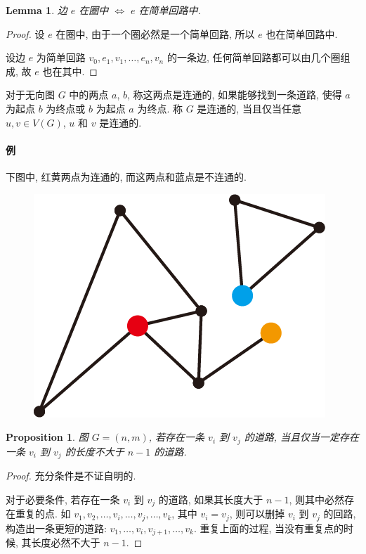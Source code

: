 \documentclass[UTF8]{ctexart}
\theoremstyle{mystyle}
\newtheorem{lemma}{Lemma}[section]
\newtheorem{proposition}{Proposition}[section]
\theoremstyle{myremark}
\theoremstyle{plain}
\begin{document}
\begin{lemma}
    边 $ e $ 在圈中 $ \iff $ $ e $ 在简单回路中.
\end{lemma}

\begin{proof}
    设 $ e $ 在圈中, 由于一个圈必然是一个简单回路, 所以 $ e $ 也在简单回路中.

    设边 $ e $ 为简单回路 $ v_0, e_1, v_1, \dots, e_n, v_n $ 的一条边, 任何简单回路都可以由几个圈组成, 故 $ e $ 也在其中.
\end{proof}



\begin{definition}[\text{连通}]
    对于无向图 $ G $ 中的两点 $ a $, $ b $, 称这两点是连通的, 如果能够找到一条道路, 使得 $ a $ 为起点 $ b $ 为终点或 $ b $ 为起点 $ a $ 为终点. 称 $ G $ 是连通的, 当且仅当任意 $ u, v \in V(G) $, $ u $ 和 $ v $ 是连通的.
\end{definition}

\paragraph{例}
下图中, 红黄两点为连通的, 而这两点和蓝点是不连通的.
\begin{figure}[H]
    \centering
    \includegraphics[width = 0.25\linewidth]{./images/connected_1.png}
\end{figure}

\begin{proposition} \label{connectivity}
    图 $ G = (n, m) $, 若存在一条 $ v_i $ 到 $ v_j $ 的道路, 当且仅当一定存在一条 $ v_i $ 到 $ v_j $ 的长度不大于 $ n - 1 $ 的道路.
\end{proposition}

\begin{proof}
    充分条件是不证自明的.

    对于必要条件, 若存在一条 $ v_i $ 到 $ v_j $ 的道路, 如果其长度大于 $ n - 1 $, 则其中必然存在重复的点. 如 $ v_1, v_2, \dots, v_i, \dots, v_j, \dots, v_k $, 其中 $ v_i = v_j $, 则可以删掉 $ v_i $ 到 $ v_j $ 的回路, 构造出一条更短的道路: $ v_1, \dots, v_i, v_{j + 1}, \dots, v_k $. 重复上面的过程, 当没有重复点的时候, 其长度必然不大于 $ n - 1 $.
\end{proof}
\end{document}
